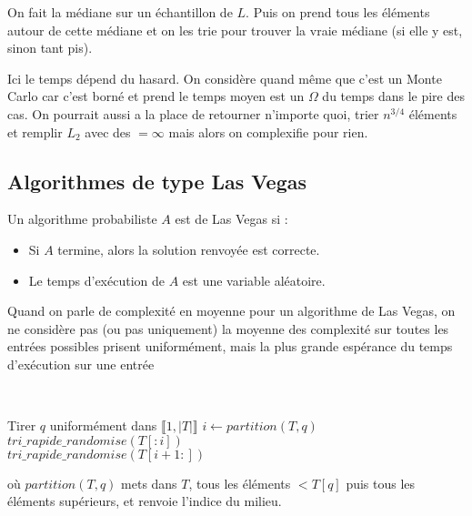 \begin{idee}
	On fait la médiane sur un échantillon de $L$. Puis on prend tous les éléments autour de cette médiane et on les trie pour trouver la vraie médiane (si elle y est, sinon tant pis).
\end{idee}

\begin{com}
	Ici le temps dépend du hasard. On considère quand même que c'est un Monte Carlo car c'est borné et prend le temps moyen est un $\Omega$ du temps dans le pire des cas. On pourrait aussi a la place de retourner n'importe quoi, trier $n^{3/4}$ éléments et remplir $L_2$ avec des $= \infty$ mais alors on complexifie pour rien.
\end{com}

\subsection{Algorithmes de type Las Vegas}

\begin{definition} 
	Un algorithme probabiliste $A$ est de Las Vegas si :
	\begin{itemize}
		\item Si $A$ termine, alors la solution renvoyée est correcte.
		\item Le temps d'exécution de $A$ est une variable aléatoire.
	\end{itemize}
\end{definition}

\begin{rem}
	Quand on parle de complexité en moyenne pour un algorithme de Las Vegas, on ne considère pas (ou pas uniquement) la moyenne des complexité sur toutes les entrées possibles prisent uniformément, mais la plus grande espérance du temps d'exécution sur une entrée
\end{rem}


\begin{algo}
	\enspace\\
	\label{11-tri-rapide}
	\begin{algorithm}[H]
		\caption{$tri\_rapide\_randomise(T)$}
		Tirer $q$ uniformément dans $\llbracket 1, |T| \rrbracket$ 
		$i \gets partition(T, q)$\\
		$tri\_rapide\_randomise(T[:i])$\\
		$tri\_rapide\_randomise(T[i+1:])$\\
	\end{algorithm}
	où $partition(T, q)$ mets dans $T$, tous les éléments $< T[q]$ puis tous les éléments supérieurs, et renvoie l'indice du milieu.
\end{algo}

